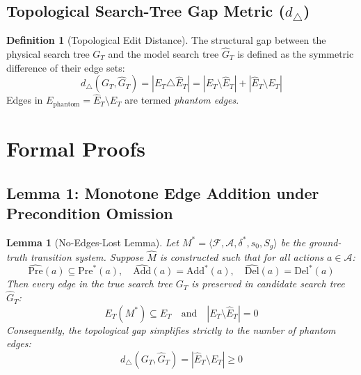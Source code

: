 \documentclass[11pt,a4paper]{article}
\newtheorem{lemma}[theorem]{Lemma}
\theoremstyle{definition}
\newtheorem{definition}[theorem]{Definition}
\theoremstyle{remark}
\begin{document}
\subsection{Topological Search-Tree Gap Metric (\texorpdfstring{$d_\triangle$}{d_triangle})}

\begin{definition}[Topological Edit Distance]
The structural gap between the physical search tree $G_T$ and the model search tree $\widehat{G}_T$ is defined as the symmetric difference of their edge sets:
\begin{equation}
    d_\triangle(G_T, \widehat{G}_T) = |E_T \triangle \widehat{E}_T| = |E_T \setminus \widehat{E}_T| + |\widehat{E}_T \setminus E_T|
\end{equation}
Edges in $E_{\text{phantom}} = \widehat{E}_T \setminus E_T$ are termed \emph{phantom edges}.
\end{definition}

\section{Formal Proofs}

\subsection{Lemma 1: Monotone Edge Addition under Precondition Omission}

\begin{lemma}[No-Edges-Lost Lemma]\label{lem:no_edges_lost}
Let $M^* = \langle \mathcal{F}, \mathcal{A}, \delta^*, s_0, S_g \rangle$ be the ground-truth transition system. Suppose $\widehat{M}$ is constructed such that for all actions $a \in \mathcal{A}$:
\begin{equation}
    \widehat{\text{Pre}}(a) \subseteq \text{Pre}^*(a), \quad \widehat{\text{Add}}(a) = \text{Add}^*(a), \quad \widehat{\text{Del}}(a) = \text{Del}^*(a)
\end{equation}
Then every edge in the true search tree $G_T$ is preserved in candidate search tree $\widehat{G}_T$:
\begin{equation}
    E_T(M^*) \subseteq \widehat{E}_T \quad \text{and} \quad |E_T \setminus \widehat{E}_T| = 0
\end{equation}
Consequently, the topological gap simplifies strictly to the number of phantom edges:
\begin{equation}
    d_\triangle(G_T, \widehat{G}_T) = |\widehat{E}_T \setminus E_T| \ge 0
\end{equation}
\end{lemma}
\end{document}
